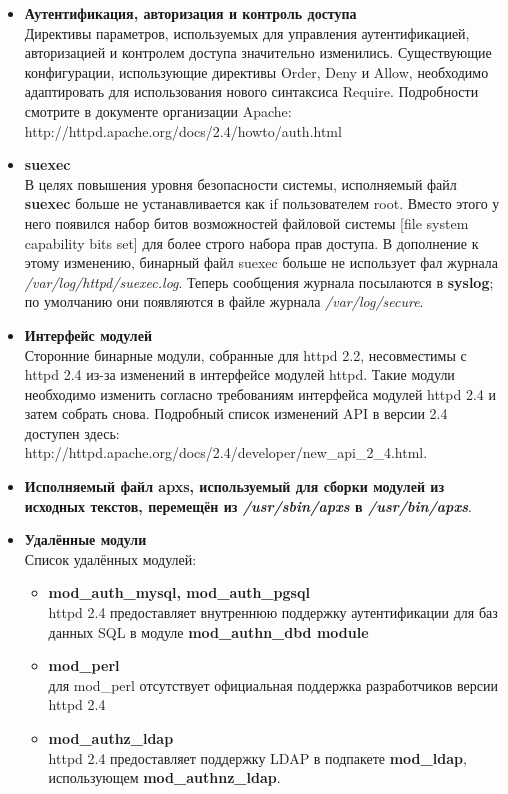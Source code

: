 \documentclass[a4paper,10pt,twoside]{article}
\begin{document}
\begin{itemize}
\begin{itemize}
\end{itemize}
\item \textbf{Аутентификация, авторизация и контроль доступа}\\
Директивы параметров, используемых для управления аутентификацией, авторизацией и контролем доступа значительно изменились. Существующие конфигурации, использующие директивы Order, Deny и Allow, необходимо адаптировать для использования нового синтаксиса Require. Подробности смотрите в документе организации Apache: http://httpd.apache.org/docs/2.4/howto/auth.html
\item \textbf{suexec}\\
В целях повышения уровня безопасности системы, исполняемый файл \textbf{suexec} больше не устанавливается как if пользователем root. Вместо этого у него появился набор битов возможностей файловой системы [file system capability bits set] для более строго набора прав доступа. В дополнение к этому изменению, бинарный файл suexec больше не использует фал журнала \textit{/var/log/httpd/suexec.log}. Теперь сообщения журнала посылаются в \textbf{syslog}; по умолчанию они появляются в файле журнала \textit{/var/log/secure}.
\item \textbf{Интерфейс модулей}\\
Сторонние бинарные модули, собранные для httpd 2.2, несовместимы с httpd 2.4 из-за изменений в интерфейсе модулей httpd. Такие модули необходимо изменить согласно требованиям интерфейса модулей httpd 2.4 и затем собрать снова. Подробный список изменений API в версии 2.4 доступен здесь: http://httpd.apache.org/docs/2.4/developer/new\_api\_2\_4.html.
\item \textbf{Исполняемый файл apxs, используемый для сборки модулей из исходных текстов, перемещён из \textit{/usr/sbin/apxs} в \textit{/usr/bin/apxs}}.
\item \textbf{Удалённые модули}\\
Список удалённых модулей:
\begin{itemize}
 \item \textbf{mod\_auth\_mysql, mod\_auth\_pgsql}\\
httpd 2.4 предоставляет внутреннюю поддержку аутентификации для баз данных SQL в модуле \textbf{mod\_authn\_dbd module}
\item \textbf{mod\_perl}\\
для mod\_perl отсутствует официальная поддержка разработчиков версии httpd 2.4
\item \textbf{mod\_authz\_ldap}\\
httpd 2.4 предоставляет поддержку LDAP в подпакете \textbf{mod\_ldap}, использующем \textbf{mod\_authnz\_ldap}.
\end{itemize}
\end{itemize}
\end{document}
